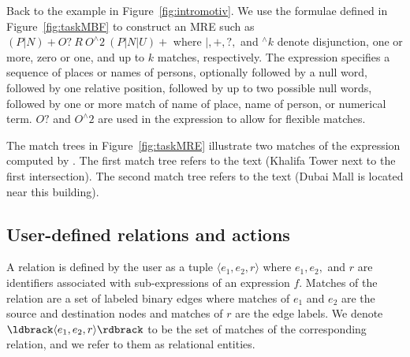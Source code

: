 Back to the example in Figure~\ref{fig:intromotiv}.
We use the formulae defined in Figure~\ref{fig:taskMBF} to construct an MRE such as
$(P|N)\!+O?~R~O^\wedge\!2~(P|N|U)+$ where 
$|,+,?,$ and $^\wedge k$ denote disjunction, one or more, zero or one, and
up to $k$ matches, respectively.
The expression specifies a sequence of places or names of persons, 
optionally followed by a null word, 
followed by one relative position, followed by up to two possible null words, 
followed by one or more match of name of place, name of person, or numerical term.
$O?$ and $O^\wedge 2$ are used in the expression to allow for flexible matches.



The match trees in Figure~\ref{fig:taskMRE} illustrate two matches of the expression computed by \framework.
The first match tree refers to the text 
(Khalifa Tower next to the first intersection).
The second match tree refers to the text 
(Dubai Mall is located near this building).

\subsection{User-defined relations and actions}

A relation is defined by the user as a tuple 
$\langle e_1,e_2,r\rangle$ where 
$e_1,e_2,$ and $r$ are identifiers associated with 
sub-expressions of an expression $f$.
Matches of the relation are a set of labeled binary edges
where matches of $e_1$ and $e_2$ are the source and destination nodes
and matches of $r$ are the edge labels.
We denote $\ldbrack \langle e_1,e_2,r\rangle \rdbrack$ to be the set of matches of the corresponding relation, 
and we refer to them as relational entities.

